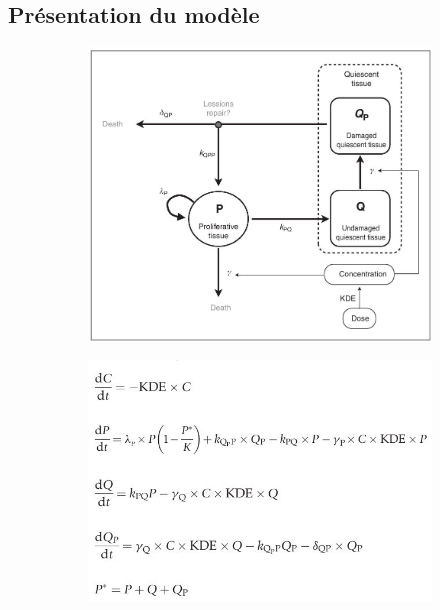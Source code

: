 \documentclass[12pt]{article}
\begin{document}
\subsection{Présentation du modèle}
\begin{figure}
    \centering
    \begin{subfigure}[t]{0.45\textwidth}
        \centering
        \includegraphics[width=\linewidth]{Image/modele.JPG} 
        \caption{} \label{fig:model}
    \end{subfigure}
    \hfill
    \begin{subfigure}[t]{0.45\textwidth}
        \centering
        \includegraphics[width=\linewidth]{Image/eq.JPG} 
        \caption{} \label{fig:teq}
    \end{subfigure}


\end{figure}
\end{document}
